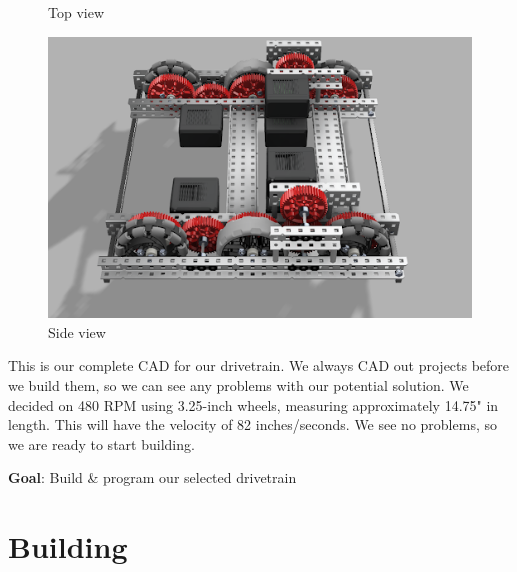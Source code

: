 \begin{figure}[hbt!]
\begin{minipage}{.5\textwidth}
        \caption{Top view}
        \label{fig:topdown}
    \end{minipage}
    \begin{minipage}{.5\textwidth}
        \centering
        \includegraphics[width=.8\linewidth]{images/Sidedown-V1-Drivetrain.png}
        \caption{Side view}
        \label{fig:sidedown}
    \end{minipage}
\end{figure}

This is our complete CAD for our drivetrain. We always CAD out projects before we build them, so we can see any problems with our potential solution. We decided on 480 RPM using 3.25-inch wheels, measuring approximately 14.75" in length. This will have the velocity of 82 inches/seconds. We see no problems, so we are ready to start building.


\label{Build-&-Program:-Drivetrain}
\textbf{Goal}: Build \& program our selected drivetrain
    \section*{Building}
